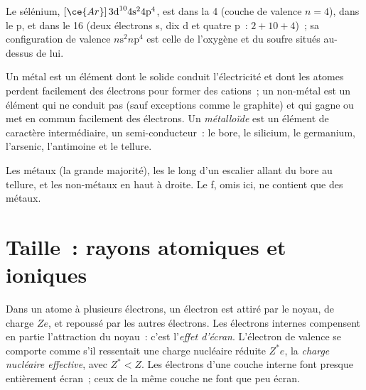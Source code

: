 \begin{example}\label{ex:b1:periodicity:position}
Le sélénium, $[\ce{Ar}]\,3\text{d}^{10} 4\text{s}^2 4\text{p}^4$, est
dans la  4 (couche de valence $n = 4$), dans le  p, et dans le
 16 (deux électrons s, dix d et quatre p~: $2 + 10 + 4$)~; sa
configuration de valence $n\text{s}^2 n\text{p}^4$ est celle de
l'oxygène et du soufre situés au-dessus de lui.
\end{example}

\begin{definition}\label{def:b1:periodicity:metalloid}
Un métal est un élément dont le solide conduit l'électricité et dont les
atomes perdent facilement des électrons pour former des cations~; un
non-métal est un élément qui ne conduit pas (sauf exceptions comme le
graphite) et qui gagne ou met en commun facilement des électrons. Un
\emph{métalloïde} est un élément de caractère intermédiaire, un
semi-conducteur~: le bore, le silicium, le germanium, l'arsenic,
l'antimoine et le tellure.
\end{definition}

\begin{omfigure}
\omperiodictable[colour=metals, legend, f block=false]

{\small Les métaux (la grande majorité), les  le long d'un
escalier allant du bore au tellure, et les non-métaux en haut à droite.
Le  f, omis ici, ne contient que des métaux.}
\end{omfigure}

\section{Taille~: rayons atomiques et ioniques}

\begin{definition}\label{def:b1:periodicity:screening}
Dans un atome à plusieurs électrons, un électron est attiré par le
noyau, de charge $Ze$, et repoussé par les autres électrons. Les
électrons internes compensent en partie l'attraction du noyau~: c'est
l'\emph{effet d'écran}. L'électron de valence se comporte comme
s'il ressentait une charge nucléaire réduite $Z^{*}e$, la \emph{charge
nucléaire effective}, avec $Z^{*} < Z$. Les électrons
d'une couche interne font presque entièrement écran~; ceux de la même
couche ne font que peu écran.
\end{definition}

